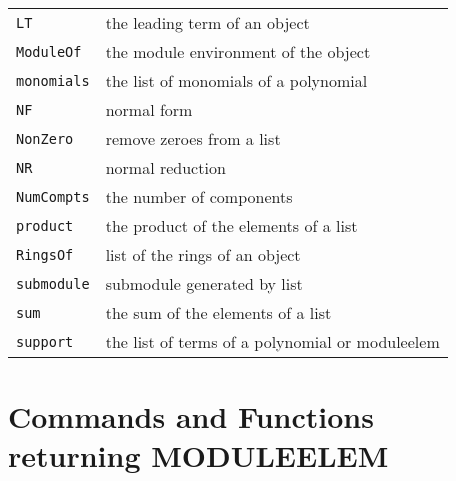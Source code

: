 \documentclass[a4paper]{mybook}
\begin{document}
\begin{center}
\begin{longtable}{ll}
{\verb~LT~} &
      the leading term of an object\\
   
{\verb~ModuleOf~} &
      the module environment of the object\\
   
{\verb~monomials~} &
      the list of monomials of a polynomial\\
   
{\verb~NF~} &
      normal form\\
   
{\verb~NonZero~} &
      remove zeroes from a list\\
   
{\verb~NR~} &
      normal reduction\\
   
{\verb~NumCompts~} &
      the number of components\\
   
{\verb~product~} &
      the product of the elements of a list\\
   
{\verb~RingsOf~} &
      list of the rings of an object\\
   
{\verb~submodule~} &
      submodule generated by list\\
   
{\verb~sum~} &
      the sum of the elements of a list\\
   
{\verb~support~} &
      the list of terms of a polynomial or moduleelem\\
   
\end{longtable}
\end{center}

\noindent



\section{Commands and Functions returning MODULEELEM}
\label{Commands and Functions returning MODULEELEM}

        
\end{document}

